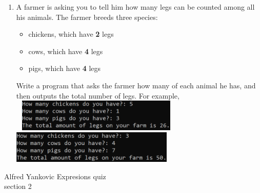 \documentclass{article}
\begin{document}
\begin{enumerate}
	\item
		A farmer is asking you to tell him how many legs can be counted among all his animals. 
		The farmer breeds three species:
		\begin{itemize}
			\item chickens, which have \textbf{2} legs
			\item cows, which have \textbf{4} legs
			\item pigs, which have \textbf{4} legs
		\end{itemize}
		Write a program that asks the farmer how many of each animal he has, and then outputs the
		total number of legs.  		
		For example, \\ \ \hfill
		\includegraphics[height = 0.6in]{./imgs/animalLegs_ex1.PNG} \hfill
		\includegraphics[height = 0.6in]{./imgs/animalLegs_ex2.PNG} \hfill \
	
	
	
	

\end{enumerate}
\pagebreak
Alfred Yankovic \hfill Expresions quiz\\
section 2\\
\end{document}
